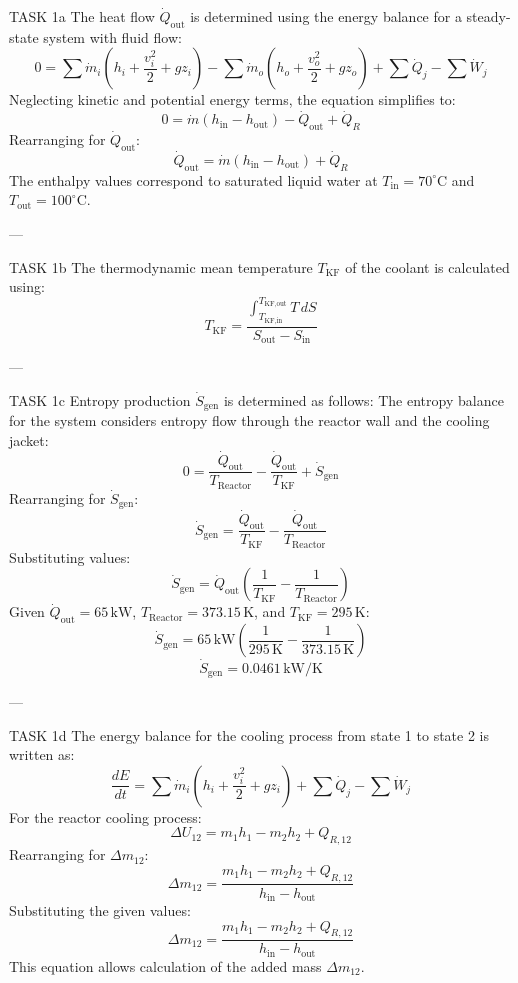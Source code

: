 TASK 1a  
The heat flow \( \dot{Q}_{\text{out}} \) is determined using the energy balance for a steady-state system with fluid flow:  
\[
0 = \sum \dot{m}_i \left( h_i + \frac{v_i^2}{2} + gz_i \right) - \sum \dot{m}_o \left( h_o + \frac{v_o^2}{2} + gz_o \right) + \sum \dot{Q}_j - \sum \dot{W}_j
\]  
Neglecting kinetic and potential energy terms, the equation simplifies to:  
\[
0 = \dot{m} \left( h_{\text{in}} - h_{\text{out}} \right) - \dot{Q}_{\text{out}} + \dot{Q}_R
\]  
Rearranging for \( \dot{Q}_{\text{out}} \):  
\[
\dot{Q}_{\text{out}} = \dot{m} \left( h_{\text{in}} - h_{\text{out}} \right) + \dot{Q}_R
\]  
The enthalpy values correspond to saturated liquid water at \( T_{\text{in}} = 70^\circ\text{C} \) and \( T_{\text{out}} = 100^\circ\text{C} \).  

---

TASK 1b  
The thermodynamic mean temperature \( T_{\text{KF}} \) of the coolant is calculated using:  
\[
T_{\text{KF}} = \frac{\int_{T_{\text{KF,in}}}^{T_{\text{KF,out}}} T \, dS}{S_{\text{out}} - S_{\text{in}}}
\]  

---

TASK 1c  
Entropy production \( \dot{S}_{\text{gen}} \) is determined as follows:  
The entropy balance for the system considers entropy flow through the reactor wall and the cooling jacket:  
\[
0 = \frac{\dot{Q}_{\text{out}}}{T_{\text{Reactor}}} - \frac{\dot{Q}_{\text{out}}}{T_{\text{KF}}} + \dot{S}_{\text{gen}}
\]  
Rearranging for \( \dot{S}_{\text{gen}} \):  
\[
\dot{S}_{\text{gen}} = \frac{\dot{Q}_{\text{out}}}{T_{\text{KF}}} - \frac{\dot{Q}_{\text{out}}}{T_{\text{Reactor}}}
\]  
Substituting values:  
\[
\dot{S}_{\text{gen}} = \dot{Q}_{\text{out}} \left( \frac{1}{T_{\text{KF}}} - \frac{1}{T_{\text{Reactor}}} \right)
\]  
Given \( \dot{Q}_{\text{out}} = 65 \, \text{kW} \), \( T_{\text{Reactor}} = 373.15 \, \text{K} \), and \( T_{\text{KF}} = 295 \, \text{K} \):  
\[
\dot{S}_{\text{gen}} = 65 \, \text{kW} \left( \frac{1}{295 \, \text{K}} - \frac{1}{373.15 \, \text{K}} \right)
\]  
\[
\dot{S}_{\text{gen}} = 0.0461 \, \text{kW/K}
\]  

---

TASK 1d  
The energy balance for the cooling process from state 1 to state 2 is written as:  
\[
\frac{dE}{dt} = \sum \dot{m}_i \left( h_i + \frac{v_i^2}{2} + gz_i \right) + \sum \dot{Q}_j - \sum \dot{W}_j
\]  
For the reactor cooling process:  
\[
\Delta U_{12} = m_1 h_1 - m_2 h_2 + Q_{R,12}
\]  
Rearranging for \( \Delta m_{12} \):  
\[
\Delta m_{12} = \frac{m_1 h_1 - m_2 h_2 + Q_{R,12}}{h_{\text{in}} - h_{\text{out}}}
\]  
Substituting the given values:  
\[
\Delta m_{12} = \frac{m_1 h_1 - m_2 h_2 + Q_{R,12}}{h_{\text{in}} - h_{\text{out}}}
\]  
This equation allows calculation of the added mass \( \Delta m_{12} \).